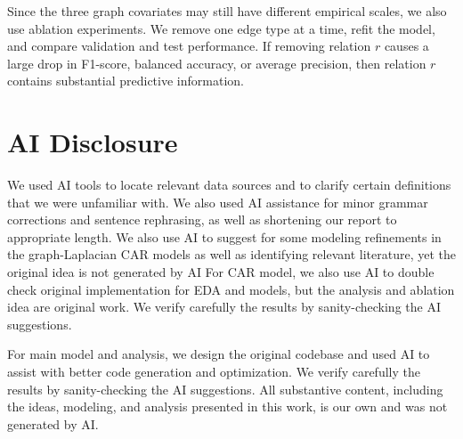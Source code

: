 \documentclass[11pt,reqno]{amsart}
\begin{document}
Since the three graph covariates may still have different empirical scales, we also use ablation experiments. We remove one edge type at a time, refit the model, and compare validation and test performance. If removing relation $r$ causes a large drop in F1-score, balanced accuracy, or average precision, then relation $r$ contains substantial predictive information.




\section*{AI Disclosure}
We used AI tools to locate relevant data sources and to clarify certain definitions that we were unfamiliar with. We also used AI assistance for minor grammar corrections and sentence rephrasing, as well as shortening our report to appropriate length. We also use AI to suggest for some modeling refinements in the graph-Laplacian CAR models as well as identifying relevant literature, yet the original idea is not generated by AI For CAR model, we also use AI to double check original implementation for EDA and models, but the analysis and ablation idea are original work. We verify carefully the results by sanity-checking the AI suggestions. 

For main model and analysis, we design the original codebase and used AI to assist with better code generation and optimization. We verify carefully the results by sanity-checking the AI suggestions. All substantive content, including the ideas, modeling, and analysis presented in this work, is our own and was not generated by AI.
\end{document}
